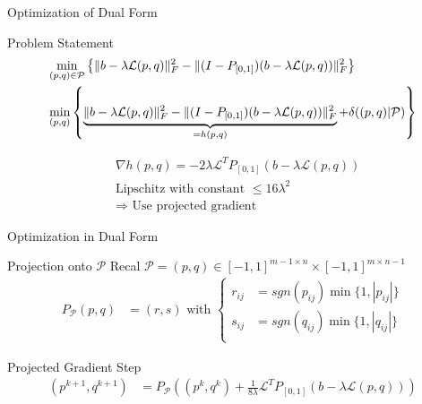 \documentclass[12pt]{beamer}
\DeclarePairedDelimiter{\norm}{\lVert}{\rVert}
\begin{document}
\begin{frame}{Optimization of Dual Form}

\begin{exampleblock}{Problem Statement}
\vspace{-5 mm}
\begin{align*}
&\underset{(p,q) \in \mathcal{P} }{\text{min}}  \left\{  \norm{b - \lambda \mathcal{L} (p,q)}_F^2 - \norm{(I-P_{[0,1]}) (b - \lambda \mathcal{L} (p,q))}_F^2   \right\}\\
&\underset{(p,q) }{\text{min}}  \left\{  \underbrace{\norm{b - \lambda \mathcal{L} (p,q)}_F^2 - \norm{(I-P_{[0,1]}) (b - \lambda \mathcal{L} (p,q))}_F^2}_{= h(p,q)} + \delta((p,q) | \mathcal{P})   \right\}
\end{align*}
\end{exampleblock}

\begin{exampleblock}{}
\begin{align*}
&\nabla h (p,q) = -2\lambda \mathcal{L}^TP_{[0,1]} (b - \lambda \mathcal{L}(p,q)) \\
&\text{Lipschitz with constant } \leq 16\lambda^2\\
&\Rightarrow \text{ Use projected gradient}
\end{align*}
\end{exampleblock}

\end{frame}

\begin{frame}{Optimization in Dual Form}

\begin{exampleblock}{Projection onto $\mathcal{P}$}
Recal $\mathcal{P} = (p,q) \in [-1,1]^{m-1 \times n}\times[-1,1]^{m \times n-1}$
\begin{align*}
P_\mathcal{P}(p,q) &= (r,s) \text{ with } \left\{ \begin{aligned}
r_{ij} &= sgn(p_{ij} ) \min \{ 1, |p_{ij}| \}\\
s_{ij} &= sgn(q_{ij} ) \min \{ 1, |q_{ij}| \}\\
\end{aligned}\right.
\end{align*}
\end{exampleblock}

\begin{exampleblock}{Projected Gradient Step}
\begin{align*}
(p^{k+1},q^{k+1} ) &= P_\mathcal{P} \left((p^k, q^k) + \frac{1}{8\lambda} \mathcal{L}^TP_{[0,1]} (b - \lambda \mathcal{L}(p,q)) \right)
\end{align*}
\end{exampleblock}

\end{frame}
\end{document}
